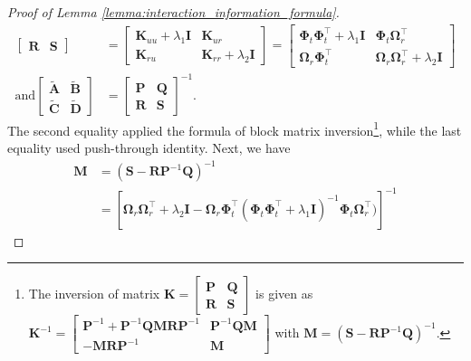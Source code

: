 \begin{proof}[Proof of Lemma \ref{lemma:interaction_information_formula}]
\begin{align*}
\begin{bmatrix}
            \mathbf{R} & \mathbf{S}
            \end{bmatrix} & = \begin{bmatrix}
            \mathbf{K}_{uu} + \lambda_1\mathbf{I} & \mathbf{K}_{ur}  \\
            \mathbf{K}_{ru}  & \mathbf{K}_{rr} + \lambda_2\mathbf{I}
            \end{bmatrix} = \begin{bmatrix}
            \boldsymbol{\Phi}_t\boldsymbol{\Phi}_t^\top + \lambda_1\mathbf{I} & \boldsymbol{\Phi}_t \boldsymbol{\Omega}_r^\top \\
            \boldsymbol{\Omega}_r\boldsymbol{\Phi}_t^\top & \boldsymbol{\Omega}_r\boldsymbol{\Omega}_r^\top + \lambda_2 \mathbf{I}\end{bmatrix} \\
            \text{and} \begin{bmatrix}
    \widetilde{\mathbf{A}} & \widetilde{\mathbf{B}} 
\\
    \widetilde{\mathbf{C}} & \widetilde{\mathbf{D}} 
        \end{bmatrix} &=\begin{bmatrix}
            \mathbf{P} & \mathbf{Q} \\
            \mathbf{R} & \mathbf{S}
            \end{bmatrix} ^{-1}.
\end{align*}
The second equality applied the formula of block matrix inversion\footnote{The inversion of matrix $\mathbf{K} = \begin{bmatrix}
        \mathbf{P} & \mathbf{Q} \\ \mathbf{R} & \mathbf{S} 
    \end{bmatrix}$ is given as $\mathbf{K}^{-1} = \begin{bmatrix}
        \mathbf{P}^{-1} + \mathbf{P}^{-1} \mathbf{QMR}\mathbf{P}^{-1} & \mathbf{P}^{-1}\mathbf{QM} \\ -\mathbf{MR}\mathbf{P}^{-1} & \mathbf{M} 
    \end{bmatrix}$ with $\mathbf{M} = (\mathbf{S} - \mathbf{R}\mathbf{P}^{-1}\mathbf{Q})^{-1}$.}, 
    while the last equality used push-through identity. Next, we have
\begin{align*}
            \mathbf{M} &= (\mathbf{S} - \mathbf{R}\mathbf{P}^{-1}\mathbf{Q})^{-1} 
\\
            &= \left[\boldsymbol{\Omega}_r \boldsymbol{\Omega}_r^\top  + \lambda_2\mathbf{I} - \boldsymbol{\Omega}_r \boldsymbol{\Phi}_t^\top (\boldsymbol{\Phi}_t \boldsymbol{\Phi}_t ^\top+ \lambda_1\mathbf{I})^{-1} \boldsymbol{\Phi}_t \boldsymbol{\Omega}_r^\top)\right]^{-1} 

\end{align*}
\end{proof}
